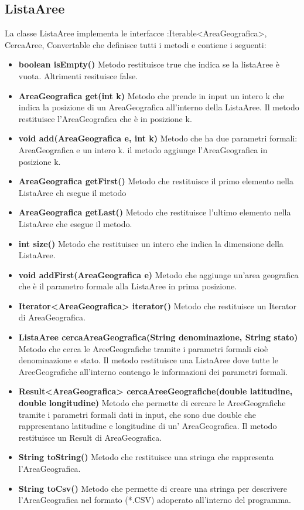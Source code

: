 \documentclass[a4paper, 12pt]{report}
\begin{document}
			\subsection{ListaAree}
			La classe ListaAree implementa le interfacce :Iterable<AreaGeografica>, CercaAree, Convertable che definisce tutti i metodi e contiene i seguenti:
			\begin{itemize}
			\item \textbf{boolean isEmpty()}
			Metodo restituisce true che indica se la listaAree è vuota. Altrimenti resituisce false.
			\item \textbf{AreaGeografica get(int k)}
			Metodo che prende in input un intero k che indica la posizione di un AreaGeografica all'interno della ListaAree. Il metodo restituisce l'AreaGeografica che è in posizione k.
			\item \textbf{void add(AreaGeografica e, int k)}
			Metodo che ha due parametri formali: AreaGeografica e un intero k.
			il metodo aggiunge l'AreaGeografica in posizione k.
			\item \textbf{AreaGeografica getFirst()}
			Metodo che restituisce il primo elemento nella ListaAree ch esegue il metodo
			\item \textbf{AreaGeografica getLast()}
			Metodo che restituisce l'ultimo elemento nella ListaAree che esegue il metodo.
			\item \textbf{int size()}
			Metodo che restituisce un intero che indica la dimensione della ListaAree.
			\item \textbf{void addFirst(AreaGeografica e)}
			Metodo che aggiunge un'area geografica che è il parametro formale alla ListaAree in prima posizione.
			\item \textbf{Iterator<AreaGeografica> iterator()}
			Metodo che restituisce un Iterator di AreaGeografica.
			\item \textbf{ListaAree cercaAreaGeografica(String denominazione, String stato)}
			Metodo che cerca le AreeGeografiche tramite i parametri formali cioè denominazione e stato. Il metodo restituisce una ListaAree dove tutte le AreeGeografiche all'interno contengo le informazioni dei parametri formali.
			\item \textbf{Result<AreaGeografica> cercaAreeGeografiche(double latitudine, double longitudine)}
			Metodo che permette di cercare le AreeGeografiche tramite i parametri formali dati in input, che sono due double che rappresentano latitudine e longitudine di un' AreaGeografica.
			Il metodo restituisce un Result di AreaGeografica.
			\item \textbf{String toString()}	
			Metodo che restituisce una stringa che rappresenta l'AreaGeografica.
			\item \textbf{String toCsv()}	
			Metodo che permette di creare una stringa per descrivere l'AreaGeografica nel formato (*.CSV) adoperato all'interno del programma.
			\end{itemize}
			
\end{document}
